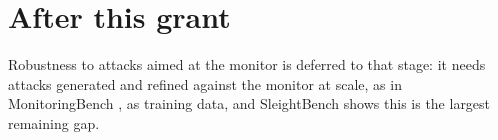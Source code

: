 \section{After this grant}
\label{sec:after}

Robustness to attacks aimed at the monitor is deferred to that stage: it needs
attacks generated and refined against the monitor at scale, as in
MonitoringBench \citep{jotautaite2026monitoringbench}, as training data, and
SleightBench \citep{najt2026sleight} shows this is the largest remaining gap.
